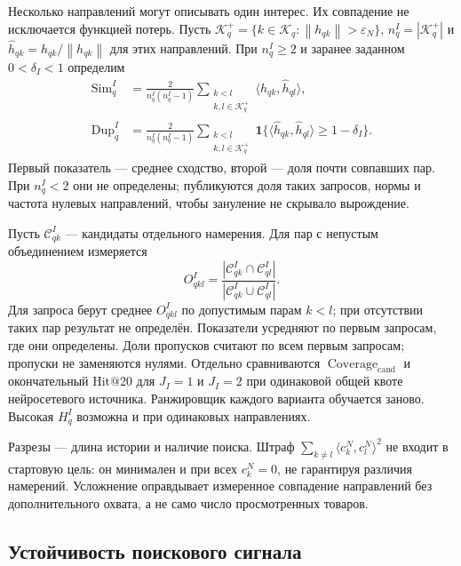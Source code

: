 \documentclass[12pt,a4paper]{article}
\newcommand{\ind}{\mathbf 1}
\newcommand{\eps}{\varepsilon}
\newcommand{\norm}[1]{\left\lVert#1\right\rVert}
\theoremstyle{plainru}
\begin{document}
Несколько направлений могут описывать один интерес. Их совпадение
не исключается функцией потерь. Пусть
$\mathcal K_q^+=\{k\in\mathcal K_q:\norm{h_{qk}}>\eps_N\}$,
$n_q^I=|\mathcal K_q^+|$ и
$\widehat h_{qk}=h_{qk}/\norm{h_{qk}}$ для этих направлений.
При $n_q^I\ge2$ и заранее заданном $0<\delta_I<1$ определим
\begin{align}\label{eq:modern-intent-duplicate}
\operatorname{Sim}_q^I
&=\frac{2}{n_q^I(n_q^I-1)}
\sum_{\substack{k<l\\k,l\in\mathcal K_q^+}}
\langle\widehat h_{qk},\widehat h_{ql}\rangle,\\
\operatorname{Dup}_q^I
&=\frac{2}{n_q^I(n_q^I-1)}
\sum_{\substack{k<l\\k,l\in\mathcal K_q^+}}
\ind\{\langle\widehat h_{qk},\widehat h_{ql}\rangle\ge1-\delta_I\}.
\nonumber
\end{align}
Первый показатель --- среднее сходство, второй --- доля почти совпавших
пар. При $n_q^I<2$ они не определены; публикуются доля таких запросов,
нормы и частота нулевых направлений, чтобы зануление не скрывало вырождение.

Пусть $\mathcal C_{qk}^I$ --- кандидаты отдельного намерения.
Для пар с непустым объединением измеряется
\begin{equation}\label{eq:modern-intent-overlap}
O_{qkl}^I=
\frac{|\mathcal C_{qk}^I\cap\mathcal C_{ql}^I|}
{|\mathcal C_{qk}^I\cup\mathcal C_{ql}^I|}.
\end{equation}
Для запроса берут среднее $O_{qkl}^I$ по допустимым парам $k<l$;
при отсутствии таких пар результат не определён.
Показатели усредняют по первым запросам, где они определены.
Доли пропусков считают по всем первым запросам; пропуски не заменяются нулями.
Отдельно сравниваются $\operatorname{Coverage}_{\mathrm{cand}}$
и окончательный Hit@20 для $J_I=1$ и $J_I=2$
при одинаковой общей квоте нейросетевого источника.
Ранжировщик каждого варианта обучается заново.
Высокая $H_q^I$ возможна и при одинаковых направлениях.

Разрезы --- длина истории и наличие поиска. Штраф
$\sum_{k\ne l}\langle c_k^N,c_l^N\rangle^2$ не входит в стартовую цель:
он минимален и при всех $c_k^N=0$, не гарантируя различия намерений.
Усложнение оправдывает измеренное совпадение направлений
без дополнительного охвата, а не само число просмотренных товаров.

\subsection{Устойчивость поискового сигнала}
\label{sec:modern-search-robustness}
\end{document}
